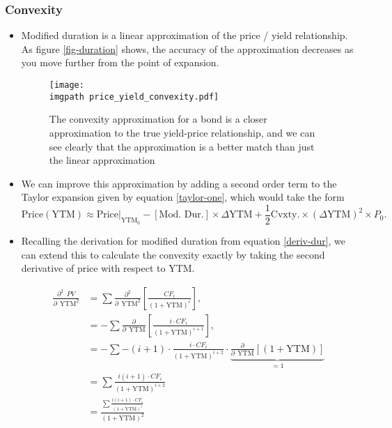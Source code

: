 \documentclass[../notes_compiled.tex]{subfiles}
\begin{document}
\subsubsection{Convexity}
\begin{itemize}
\item Modified duration is a linear approximation of the price / yield relationship. As figure \ref{fig-duration} shows, the accuracy of the approximation decreases as you move further from the point of expansion.

\begin{figure}[h]
  \centering
  \texttt{[image: \\imgpath price\_yield\_convexity.pdf]}
  \caption{The convexity approximation for a bond is a closer approximation to the true yield-price relationship, and we can see clearly that the approximation is a better match than just the linear approximation}
\end{figure}

\item We can improve this approximation by adding a second order term to the Taylor expansion given by equation \ref{taylor-one}, which would take the form
\begin{equation}
\text{Price}(\text{YTM}) \approx \text{Price}|_{\text{YTM}_{0}} - [\text{Mod. Dur.}] \times \Delta \text{YTM} + \frac{1}{2}\text{Cvxty.}\times (\Delta\text{YTM})^{2}\times P_{0}. \label{taylor-two}
\end{equation}
\item Recalling the derivation for modified duration from equation \ref{deriv-dur}, we can extend this to calculate the convexity exactly by taking the second derivative of price with respect to YTM.

\begin{align}
\frac{\partial^{2} \phantom{,}PV}{\partial \phantom{,}\text{YTM}^{2}} &= \sum\frac{\partial^{2}}{\partial \phantom{,}\text{YTM}^{2}}\left[\frac{CF_{i}}{(1+\text{YTM})^{i}}\right], \label{deriv-cvxty} \\
&=- \sum\frac{\partial}{\partial\phantom{,}\text{YTM}}\left[\frac{i\cdot CF_{i}}{(1+\text{YTM})^{i+1}}\right], \nonumber \\
&= - \sum -(i+1) \cdot \frac{i\cdot CF_{i}}{(1+\text{YTM})^{i+2}} \cdot \underbrace{\frac{\partial}{\partial\phantom{,}\text{YTM}} \left[(1+\text{YTM})\right]}_{=1} \nonumber \\
&= \sum \frac{i(i+1)\cdot CF_{i}}{(1+\text{YTM})^{i+2}} \nonumber \\
& = \frac{\sum \frac{i(i+1)\cdot CF_{i}}{(1+\text{YTM})^{i}}}{(1+\text{YTM})^{2}} \nonumber
\end{align}


\end{itemize}
\end{document}
